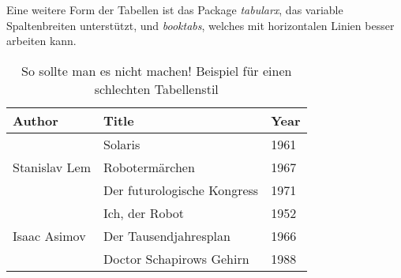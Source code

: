 Eine weitere Form der Tabellen ist das Package \textit{tabularx}, das variable Spaltenbreiten unterstützt, und \textit{booktabs}, welches mit horizontalen Linien besser arbeiten kann.
\begin{table}
	\centering
	\caption{So sollte man es nicht machen! Beispiel für einen schlechten Tabellenstil}
	\begin{tabular}{|l|l|l|}
		\hline
		Author & Title & Year \\
		\hline
		\hline
		\multirow{3}{*}{Stanislav Lem} & Solaris & 1961 \\
 			& Robotermärchen & 1967 \\
 			& Der futurologische Kongress & 1971 \\
		\hline
		\multirow{3}{*}{Isaac Asimov} & Ich, der Robot & 1952 \\
 			& Der Tausendjahresplan & 1966 \\
 			& Doctor Schapirows Gehirn & 1988 \\
		\hline
	\end{tabular}
\label{tab:beispieltabelle2}
\end{table}